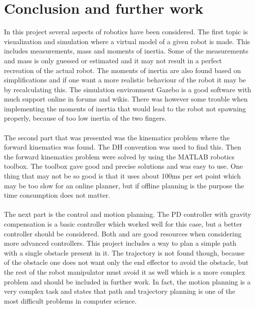 \chapter{Conclusion and further work}
In this project several aspects of robotics have been considered. The first topic is visualization and simulation where a virtual model of a given robot is made. This includes measurements, mass and moments of inertia. Some of the measurements and mass is only guessed or estimated and it may not result in a perfect recreation of the actual robot. The moments of inertia are also found based on simplifications and if one want a more realistic behaviour of the robot it may be by recalculating this. The simulation environment Gazebo is a good software with much support online in forums and wikis. There was however some trouble when implementing the moments of inertia that would lead to the robot not spawning properly, because of too low inertia of the two fingers.\\\\
The second part that was presented was the kinematics problem where the forward kinematics was found. The DH convention was used to find this. Then the forward kinematics problem were solved by using the MATLAB robotics toolbox\cite{MatlabRobTool}. The toolbox gave good and precise solutions and was easy to use. One thing that may not be so good is that it uses about 100ms per set point which may be too slow for an online planner, but if offline planning is the purpose the time consumption does not matter.
\\\\
The next part is the control and motion planning. The PD controller with gravity compensation is a basic controller which worked well for this case, but a better controller should be considered. Both \cite{spong} and \cite{Siciliano} are good resources when considering more advanced controllers. This project includes a way to plan a simple path with a single obstacle present in it. The trajectory is not found though, because of the obstacle one does not want only the end effector to avoid the obstacle, but the rest of the robot manipulator must avoid it as well which is a more complex problem and should be included in further work. In fact, the motion planning is a very complex task and \cite{spong} states that path and trajectory planning is one of the most difficult problems in computer science.